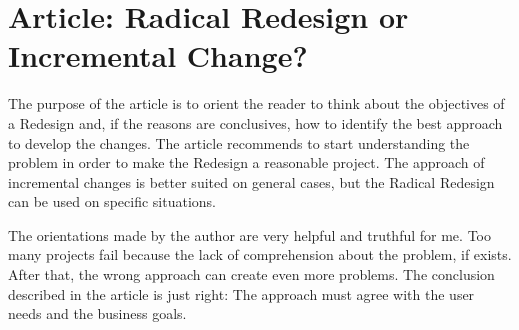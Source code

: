 \chapter{Article: Radical Redesign or Incremental Change?}
	The purpose of the article is to orient the reader to think about the objectives of a Redesign and, if the reasons are conclusives, how to identify the best approach to develop the changes. The article recommends to start understanding the problem in order to make the Redesign a reasonable project. The approach of incremental changes is better suited on general cases, but the Radical Redesign can be used on specific situations.

	The orientations made by the author are very helpful and truthful for me. Too many projects fail because the lack of comprehension about the problem, if exists. After that, the wrong approach can create even more problems. The conclusion described in the article is just right: The approach must agree with the user needs and the business goals.
